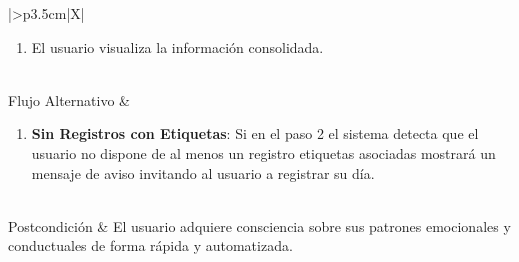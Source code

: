 \begin{xltabular}{\textwidth}{|>{\bfseries}p{3.5cm}|X|}
\begin{enumerate}[leftmargin=0.5cm, topsep=0pt, partopsep=0pt, parsep=0pt, itemsep=4pt]
        \item El usuario visualiza la información consolidada.
    \end{enumerate} 
    \\ \hline
    Flujo Alternativo & 
    \begin{enumerate}[leftmargin=0.5cm, topsep=0pt, partopsep=0pt, parsep=0pt, itemsep=4pt]
        \item \textbf{Sin Registros con Etiquetas}: Si en el paso 2 el sistema detecta que el usuario no dispone de al menos un registro etiquetas asociadas mostrará un mensaje de aviso invitando al usuario a registrar su día.
    \end{enumerate}
    \\ \hline
    Postcondición & El usuario adquiere consciencia sobre sus patrones emocionales y conductuales de forma rápida y automatizada. \\ \hline

    \caption{CU12: Visualizar Resumen Estadístico}
    \label{tab:esp_cu12} \\
\end{xltabular}
\endgroup

